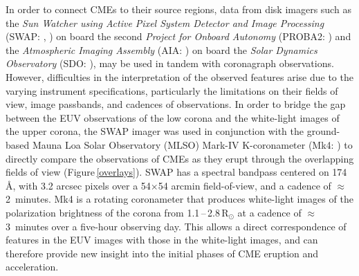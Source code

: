 \documentclass[namedreferences]{solarphysics}
\begin{document}
\begin{article}
In order to connect CMEs to their source regions, data from disk imagers such as the \emph{Sun Watcher using Active Pixel System Detector and Image Processing} (SWAP: , ) on board the second \emph{Project for Onboard Autonomy} (PROBA2: ) and the \emph{Atmospheric Imaging Assembly} (AIA: ) on board the \emph{Solar Dynamics Observatory} (SDO: ), may be used in tandem with coronagraph observations. However, difficulties in the interpretation of the observed features arise due to the varying instrument specifications, particularly the limitations on their fields of view, image passbands, and cadences of observations. In order to bridge the gap between the EUV observations of the low corona and the white-light images of the upper corona, the SWAP imager was used in conjunction with the ground-based Mauna Loa Solar Observatory (MLSO) Mark-IV K-coronameter (Mk4: ) to directly compare the observations of CMEs as they erupt through the overlapping fields of view (Figure\,\ref{overlays}). SWAP has a spectral bandpass centered on 174\,{\AA}, with 3.2 arcsec pixels over a 54$\times$54 arcmin field-of-view, and a cadence of $\approx$\,2~minutes. Mk4 is a rotating coronameter that produces white-light images of the polarization brightness of the corona from 1.1\,--\,2.8\,R$_{\odot}$ at a cadence of $\approx$\,3~minutes over a five-hour observing day. This allows a direct correspondence of features in the EUV images with those in the white-light images, and can therefore provide new insight into the initial phases of CME eruption and acceleration.


\end{article}
\end{document}
